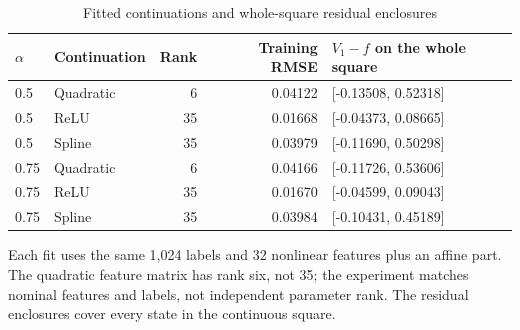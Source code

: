 \begin{table}[htbp]
\caption{Fitted continuations and whole-square residual enclosures}\label{tab:fits95}
\centering\small
\begin{tabular}{@{}llrrl@{}}
\toprule
$\alpha$ & Continuation & Rank & Training RMSE & $V_1-f$ on the whole square\\\midrule
0.5 & Quadratic & 6 & 0.04122 & [-0.13508, 0.52318]\\
0.5 & ReLU & 35 & 0.01668 & [-0.04373, 0.08665]\\
0.5 & Spline & 35 & 0.03979 & [-0.11690, 0.50298]\\
0.75 & Quadratic & 6 & 0.04166 & [-0.11726, 0.53606]\\
0.75 & ReLU & 35 & 0.01670 & [-0.04599, 0.09043]\\
0.75 & Spline & 35 & 0.03984 & [-0.10431, 0.45189]\\
\bottomrule
\end{tabular}
\par\smallskip\begin{minipage}{.98\linewidth}\footnotesize Each fit uses the same 1,024 labels and 32 nonlinear features plus an affine part. The quadratic feature matrix has rank six, not 35; the experiment matches nominal features and labels, not independent parameter rank. The residual enclosures cover every state in the continuous square.\end{minipage}
\end{table}
